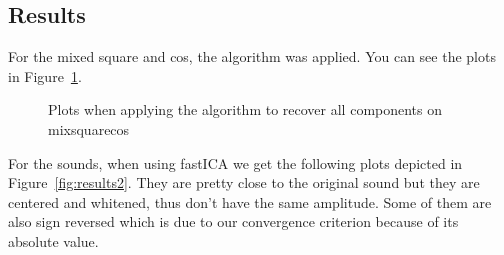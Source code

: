 \documentclass[10pt,a4paper]{article}
\begin{document}
\subsection{Results}
For the mixed square and cos, the algorithm was applied. You can see the plots in Figure~\ref{fig:res3}.
\begin{figure}
    \centering
    \caption{Plots when applying the algorithm to recover all components on mixsquarecos}
    \label{fig:res3}
\end{figure}
For the sounds, when using fastICA we get the following plots depicted in Figure~\ref{fig:results2}. They are pretty close to the original sound but they are centered and whitened, thus don't have the same amplitude. Some of them are also sign reversed which is due to our convergence criterion because of its absolute
value.
\end{document}
